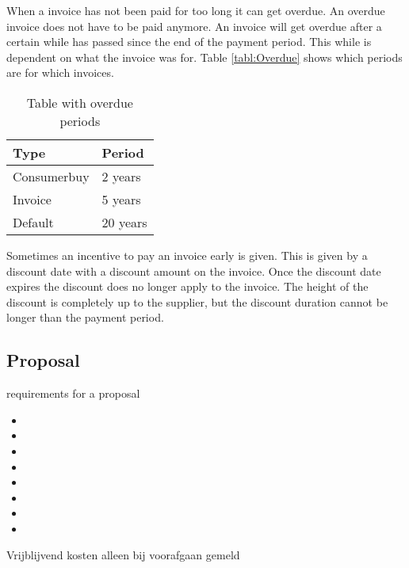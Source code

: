 \documentclass{report}
\begin{document}
When a invoice has not been paid for too long it can get overdue. An overdue invoice does not have to be paid anymore. An invoice will get overdue after a certain while has passed since the end of the payment period. This while is dependent on what the invoice was for. Table \ref{tabl:Overdue} shows which periods are for which invoices.
\begin{table}[h]
	\centering
	\label{tab:Overdue}
	\begin{tabular}{l|l}
		Type        & Period   \\\hline \hline
		Consumerbuy & 2 years  \\\hline
		Invoice     & 5 years  \\\hline
		Default     & 20 years   	
	\end{tabular}
	\caption{Table with overdue periods}
\end{table}

Sometimes an incentive to pay an invoice early is given. This is given by a discount date with a discount amount on the invoice. Once the discount date expires the discount does no longer apply to the invoice. The height of the discount is completely up to the supplier, but the discount duration cannot be longer than the payment period.   

\subsection{Proposal} %
requirements for a proposal
\begin{itemize}
	\item 
	\item 
	\item 
	\item 
	\item 
	\item 
	\item 
	\item 
\end{itemize}
Vrijblijvend
kosten alleen bij voorafgaan gemeld
\end{document}
